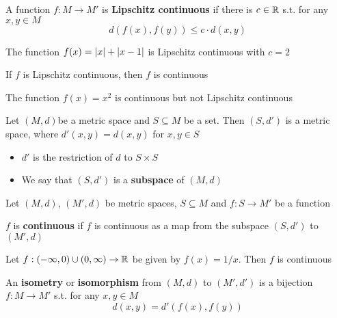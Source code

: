 \documentclass[11pt]{article}
\begin{document}
\begin{definition}[]
A function \(f:M\to M'\) is \textbf{Lipschitz continuous} if there is \(c\in\mathbb{R}\) s.t. for any \(x,y\in M\)
\begin{equation*}
d(f(x),f(y))\le c\cdot d(x,y)
\end{equation*}
\end{definition}

\begin{examplle}[In \(\R\)]
The function \(f(x)=\abs{x}+\abs{x-1}\) is Lipschitz continuous with \(c=2\)
\end{examplle}

\begin{proposition}[]
If \(f\) is Lipschitz continuous, then \(f\) is continuous
\end{proposition}

\begin{examplle}[]
The function \(f(x)=x^2\) is continuous but not Lipschitz continuous
\end{examplle}

\begin{definition}[]
Let \((M,d)\)be a metric space and \(S\subseteq M\) be a set. Then \((S,d')\) is a metric space,
where \(d'(x,y)=d(x,y)\) for \(x,y\in S\)
\begin{itemize}
\item \(d'\) is the restriction of \(d\) to \(S\times S\)
\item We say that \((S,d')\) is a \textbf{subspace} of \((M,d)\)
\end{itemize}
\end{definition}

Let \((M,d)\), \((M',d)\) be metric spaces, \(S\subseteq M\) and \(f:S\to M'\) be a function

\begin{definition}[]
\(f\)  is \textbf{continuous} if \(f\) is continuous as a map from the subspace \((S,d')\) to \((M',d)\)
\end{definition}

\begin{examplle}[in \(\R\)]
Let \(f:(-\infty,0)\cup(0,\infty)\to\mathbb{R}\)  be given by \(f(x)=1/x\). Then \(f\) is continuous
\end{examplle}

\begin{definition}[]
An \textbf{isometry} or \textbf{isomorphism} from \((M,d)\) to \((M',d')\) is a bijection \(f:M\to M'\) s.t. for
any \(x,y\in M\)
\begin{equation*}
d(x,y)=d'(f(x),f(y))
\end{equation*}
\end{definition}
\end{document}
